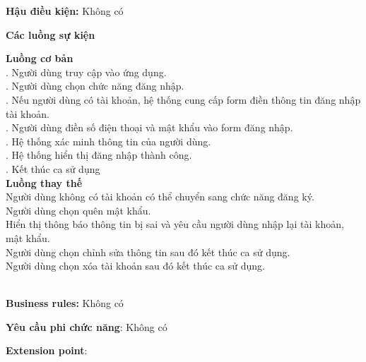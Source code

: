 \textbf{Hậu điều kiện:} Không có

\textbf{Các luồng sự kiện}

\begin{small}
\textbf{Luồng cơ bản}\\
. Người dùng truy cập vào ứng dụng.\\
. Người dùng chọn chức năng đăng nhập.\\
. Nếu người dùng có tài khoản, hệ thống cung cấp form điền thông tin đăng nhập tài khoản.\\
. Người dùng điền số điện thoại và mật khẩu vào form đăng nhập.\\
. Hệ thống xác minh thông tin của người dùng.\\
. Hệ thống hiển thị đăng nhập thành công.\\
. Kết thúc ca sử dụng\\

\textbf{Luồng thay thế}\\
 Người dùng không có tài khoản có thể chuyển sang chức năng đăng ký.\\
 Người dùng chọn quên mật khẩu.\\
 Hiển thị thông báo thông tin bị sai và yêu cầu người dùng nhập lại tài khoản, mật khẩu.\\
 Người dùng chọn chỉnh sửa thông tin sau đó kết thúc ca sử dụng.\\
 Người dùng chọn xóa tài khoản sau đó kết thúc ca sử dụng.\\
\end{small}\\
\textbf{\indent Business rules:} Không có

\textbf{Yêu cầu phi chức năng}: Không có

\textbf{Extension point}:

